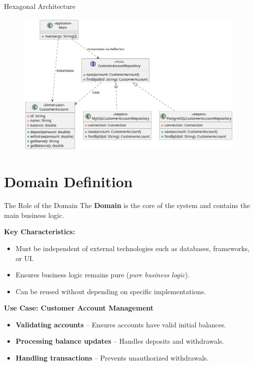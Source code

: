 \documentclass[aspectratio=169, table]{beamer}
\begin{document}
\begin{frame}[fragile]{Hexagonal Architecture}
	\vspace{20pt}
	\begin{figure}[h]
		\centering
		\includegraphics[width=.85\textwidth]{../images/out/hexagonal_component_diagram.png}
		\label{fig:hexagonal_class_diagram}
	\end{figure}
\end{frame}


\section{Domain Definition}
\begin{frame}[fragile]{The Role of the Domain}
	\vspace{20pt}
	The \textbf{Domain} is the core of the system and contains the main business logic. 
	
	\textbf{Key Characteristics:}
	\begin{itemize}
		\item Must be independent of external technologies such as databases, frameworks, or UI.
		\item Ensures business logic remains pure (\textit{pure business logic}).
		\item Can be reused without depending on specific implementations.
	\end{itemize}
	
	\textbf{Use Case: Customer Account Management}
	\begin{itemize}
		\item \textbf{Validating accounts} – Ensures accounts have valid initial balances.
		\item \textbf{Processing balance updates} – Handles deposits and withdrawals.
		\item \textbf{Handling transactions} – Prevents unauthorized withdrawals.
	\end{itemize}
\end{frame}
\end{document}
